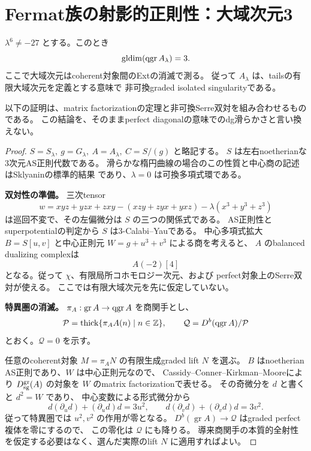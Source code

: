 \section{Fermat族の射影的正則性：大域次元3}

\begin{theorem}\label{thm:smooth}
$\lambda^6\ne-27$ とする。このとき
\[
 \operatorname{gldim}(\operatorname{qgr} A_\lambda)=3.
\]
ここで大域次元はcoherent対象間のExtの消滅で測る。
従って $A_\lambda$ は、tailsの有限大域次元を定義とする意味で
非可換graded isolated singularityである。
\end{theorem}

以下の証明は、matrix factorizationの定理と非可換Serre双対を組み合わせるものである。
この結論を、そのままperfect diagonalの意味でのdg滑らかさと言い換えない。

\begin{proof}
$S=S_\lambda,\ g=G_\lambda,\ A=A_\lambda,\ C=S/(g)$ と略記する。
$S$ は左右noetherianな3次元AS正則代数である。
滑らかな楕円曲線の場合のこの性質と中心商の記述はSklyaninの標準的結果
\cite[Section 2.3]{WWY}であり、$\lambda=0$ は可換多項式環である。

\textbf{双対性の準備。}
三次tensor
\[
 w=xyz+yzx+zxy-(xzy+zyx+yxz)-\lambda(x^3+y^3+z^3)
\]
は巡回不変で、その左偏微分は $S$ の三つの関係式である。
AS正則性とsuperpotentialの判定\cite[Lemma 2.15]{IM}から $S$ は3-Calabi--Yauである。
中心多項式拡大 $B=S[u,v]$ と中心正則元 $W=g+u^3+v^3$ による商を考えると、
$A$ のbalanced dualizing complexは
\[
 A(-2)[4]
\]
となる。従って $\chi$、有限局所コホモロジー次元、および
perfect対象上のSerre双対が使える\cite[Theorem 4.2, Corollary 4.3]{YZ}。
ここでは有限大域次元を先に仮定していない。

\textbf{特異圏の消滅。}
$\pi_A:\operatorname{gr}A\to\operatorname{qgr} A$ を商関手とし、
\[
 \mathcal P=\operatorname{thick}\{\pi_AA(n)\mid n\in\mathbb Z\},
 \qquad \mathcal Q=D^b(\operatorname{qgr} A)/\mathcal P
\]
とおく。$\mathcal Q=0$ を示す。

任意のcoherent対象 $M=\pi_A N$ の有限生成graded lift $N$ を選ぶ。
$B$ はnoetherian AS正則であり、$W$ は中心正則元なので、
Cassidy--Conner--Kirkman--Moore\cite[Theorems 4.7, 5.5]{CCKM}により
$D_{\mathrm{sg}}^{\mathrm{gr}}(A)$ の対象を $W$ のmatrix factorizationで表せる。
その奇微分を $d$ と書くと $d^2=W$ であり、
中心変数による形式微分から
\[
 d(\partial_ud)+(\partial_ud)d=3u^2,\qquad
 d(\partial_vd)+(\partial_vd)d=3v^2.
\]
従って特異圏では $u^2,v^2$ の作用が零となる。
$D^b(\operatorname{gr}A)\to\mathcal Q$ はgraded perfect複体を零にするので、
この零化は $\mathcal Q$ にも降りる。
導来商関手の本質的全射性を仮定する必要はなく、選んだ実際のlift $N$ に適用すればよい。


\end{proof}
